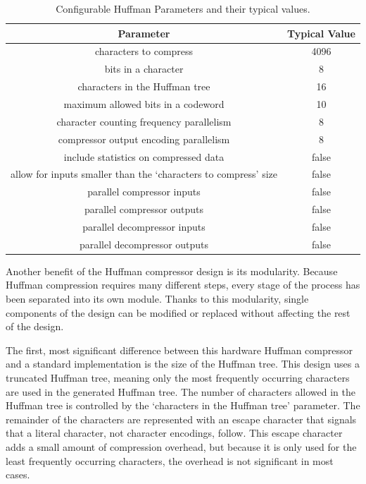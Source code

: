 \documentclass[doublespace,nopageskip]{VTthesis}
\begin{document}
\begin{table}[htb]
	\centering
	\caption{Configurable Huffman Parameters and their typical values.}
	\begin{tabular}{cc}
	    \toprule
	    Parameter & Typical Value \\
	    \midrule
	    characters to compress & 4096 \\
	    \midrule
	    bits in a character & 8 \\
	    \midrule
	    characters in the Huffman tree & 16 \\
	    \midrule
	    maximum allowed bits in a codeword & 10 \\
	    \midrule
	    character counting frequency parallelism & 8 \\
	    \midrule
	    compressor output encoding parallelism & 8 \\
	    \midrule
	    include statistics on compressed data & false \\
	    \midrule
	    allow for inputs smaller than the `characters to compress' size & false \\
	    \midrule
	    parallel compressor inputs & false \\
	    \midrule
	    parallel compressor outputs & false \\
	    \midrule
	    parallel decompressor inputs & false \\ 
	    \midrule
	    parallel decompressor outputs & false \\
	    \bottomrule
	\end{tabular}
	\label{tab:huffman-configuration-table}
\end{table}

Another benefit of the Huffman compressor design is its modularity. Because Huffman compression requires many different steps, every stage of the process has been separated into its own module. Thanks to this modularity, single components of the design can be modified or replaced without affecting the rest of the design.

The first, most significant difference between this hardware Huffman compressor and a standard implementation is the size of the Huffman tree. This design uses a truncated Huffman tree, meaning only the most frequently occurring characters are used in the generated Huffman tree. The number of characters allowed in the Huffman tree is controlled by the `characters in the Huffman tree' parameter. The remainder of the characters are represented with an escape character that signals that a literal character, not character encodings, follow. This escape character adds a small amount of compression overhead, but because it is only used for the least frequently occurring characters, the overhead is not significant in most cases.
\end{document}
